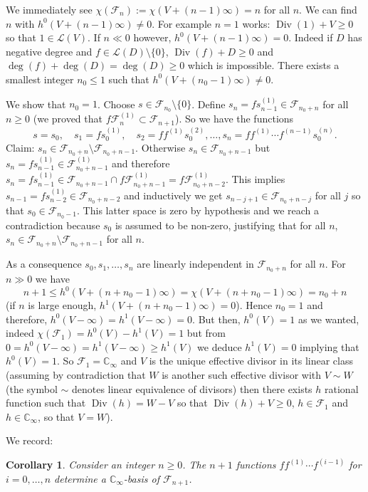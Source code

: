 \documentclass[11pt]{amsart}
\numberwithin{equation}{section}
\newcommand{\Div}{\operatorname{Div}}
\newcommand{\CC}{\mathbb{C}}
\newtheorem{Corollary}[Theorem]{Corollary}
\begin{document}
We immediately see $\chi(\mathcal{F}_n):=\chi(V+(n-1)\infty)=n$ for all $n$. We can find $n$ with $h^0(V+(n-1)\infty)\neq0$.
For example $n=1$ works: $\Div(1)+V\geq 0$ so that $1\in\mathcal{L}(V)$. If $n\ll 0$ however, $h^0(V+(n-1)\infty)=0$. Indeed
if $D$ has negative degree and $f\in\mathcal{L}(D)\setminus\{0\}$, $\Div(f)+D\geq0$ and $\deg(f)+\deg(D)=\deg(D)\geq0$ which is impossible. There exists a smallest integer $n_0\leq 1$ such that $h^0(V+(n_0-1)\infty)\neq0$. 

We show that $n_0=1$. Choose $s\in\mathcal{F}_{n_0}\setminus\{0\}$. Define $s_n=fs_{n-1}^{(1)}\in\mathcal{F}_{n_0+n}$
for all $n\geq 0$ (we proved that $f\mathcal{F}^{(1)}_n\subset\mathcal{F}_{n+1}$). So we have the functions
$$s=s_0,\quad s_1=fs_0^{(1)},\quad s_2=ff^{(1)}s_0^{(2)},\ldots,s_n=ff^{(1)}\cdots f^{(n-1)}s_0^{(n)}.$$
Claim: $s_n\in\mathcal{F}_{n_0+n}\setminus\mathcal{F}_{n_0+n-1}$. Otherwise $s_n\in\mathcal{F}_{n_0+n-1}$
but $s_n=fs_{n-1}^{(1)}\in\mathcal{F}_{n_0+n-1}^{(1)}$ and therefore $s_n=fs_{n-1}^{(1)}\in\mathcal{F}_{n_0+n-1}\cap f\mathcal{F}_{n_0+n-1}^{(1)}=f\mathcal{F}_{n_0+n-2}^{(1)}$. This implies $s_{n-1}=fs_{n-2}^{(1)}\in\mathcal{F}_{n_0+n-2}$
and inductively we get $s_{n-j+1}\in\mathcal{F}_{n_0+n-j}$ for all $j$ so that $s_0\in\mathcal{F}_{n_0-1}$. This latter space is zero by hypothesis and we reach a contradiction because $s_0$ is assumed to be non-zero, justifying that for all $n$, 
$s_n\in\mathcal{F}_{n_0+n}\setminus\mathcal{F}_{n_0+n-1}$ for all $n$.

As a consequence $s_0,s_1,\ldots,s_n$ are linearly independent in $\mathcal{F}_{n_0+n}$ for all $n$. For $n\gg0$ we have
$$n+1\leq h^0(V+(n+n_0-1)\infty)=\chi(V+(n+n_0-1)\infty)=n_0+n$$ (if $n$ is large enough, $h^1(V+(n+n_0-1)\infty)=0$). Hence
$n_0=1$ and therefore, $h^0(V-\infty)=h^1(V-\infty)=0$. But then, $h^0(V)=1$ as we wanted, indeed $\chi(\mathcal{F}_1)=h^0(V)-h^1(V)=1$ but from $0=h^0(V-\infty)=h^1(V-\infty)\geq h^1(V)$ we deduce $h^1(V)=0$ implying that $h^0(V)=1$. So $\mathcal{F}_1=\CC_\infty$ and $V$ is the unique effective divisor in its linear class (assuming by contradiction that $W$ is another such effective divisor with $V\sim W$ (the symbol $\sim$ denotes linear equivalence of divisors) then there exists $h$ rational function such that $\Div(h)=W-V$ so that $\Div(h)+V\geq0$, $h\in\mathcal{F}_1$ and $h\in\CC_\infty$, so that $V=W$).

We record:

\begin{Corollary}\label{corollary-better-bases}
Consider an integer $n\geq 0$. The $n+1$ functions $ff^{(1)}\cdots f^{(i-1)}$ for $i=0,\ldots,n$ determine a $\CC_\infty$-basis of $\mathcal{F}_{n+1}$.
\end{Corollary}
\end{document}
